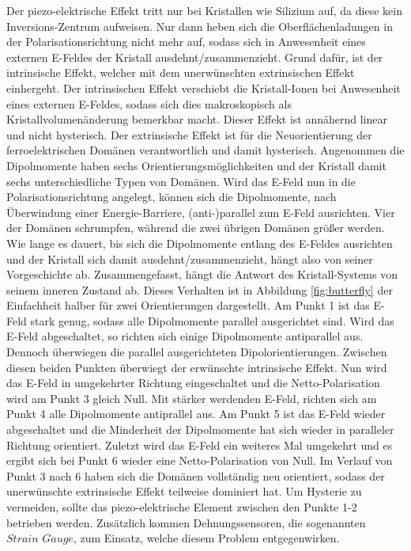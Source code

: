 \noindent
Der piezo-elektrische
Effekt tritt nur bei Kristallen wie Silizium auf, da diese kein Inversions-Zentrum
aufweisen. Nur dann heben sich die Oberflächenladungen in der Polarisationsrichtung
nicht mehr auf, sodass sich in Anwesenheit eines externen E-Feldes der Kristall
ausdehnt/zusammenzieht. Grund dafür, ist der intrinsische Effekt, welcher
mit dem unerwünschten extrinsischen Effekt einhergeht. Der intrinsischen Effekt
verschiebt die Kristall-Ionen bei Anwesenheit eines externen E-Feldes, sodass sich
dies makroskopisch als Kristallvolumenänderung bemerkbar macht. Dieser Effekt ist
annähernd linear und nicht hysterisch. Der extrinsische Effekt  ist für die
Neuorientierung der ferroelektrischen Domänen verantwortlich und damit hysterisch.
Angenommen die Dipolmomente haben sechs Orientierungsmöglichkeiten
und der Kristall damit sechs unterschiedliche Typen von Domänen. Wird das E-Feld nun in
die Polarisationsrichtung angelegt, können sich die Dipolmomente, nach Überwindung
einer Energie-Barriere, (anti-)parallel zum E-Feld ausrichten. Vier der Domänen
schrumpfen, während die zwei übrigen Domänen größer werden. Wie lange es dauert,
bis sich die Dipolmomente entlang des E-Feldes ausrichten und der Kristall sich damit
ausdehnt/zusammenzieht, hängt also von seiner Vorgeschichte ab. Zusammengefasst,
hängt die Antwort des Kristall-Systems von seinem inneren Zustand ab. Dieses
Verhalten ist in Abbildung \ref{fig:butterfly} der Einfachheit halber für zwei
Orientierungen dargestellt. Am Punkt 1 ist das E-Feld stark genug, sodass alle
Dipolmomente parallel ausgerichtet sind. Wird das E-Feld abgeschaltet, so
richten sich einige Dipolmomente antiparallel aus. Dennoch überwiegen die parallel
ausgerichteten Dipolorientierungen. Zwischen diesen beiden Punkten überwiegt der
erwünschte intrinsische Effekt.
Nun wird das E-Feld in umgekehrter Richtung eingeschaltet und die Netto-Polarisation
wird am Punkt 3 gleich Null. Mit stärker werdenden E-Feld, richten sich am Punkt 4 alle
Dipolmomente antiprallel aus. Am Punkt 5 ist das E-Feld wieder abgeschaltet und
die Minderheit der Dipolmomente hat sich wieder in paralleler Richtung orientiert.
Zuletzt wird das E-Feld ein weiteres Mal umgekehrt und es ergibt sich bei Punkt 6
wieder eine Netto-Polarisation
von Null. Im Verlauf von Punkt 3 nach 6 haben sich die Domänen vollständig neu orientiert,
sodass der unerwünschte extrinsische Effekt teilweise dominiert hat. Um Hysterie
zu vermeiden, sollte das piezo-elektrische Element zwischen den Punkte 1-2 betrieben
werden. Zusätzlich kommen Dehnungssensoren, die sogenannten $\textit{Strain Gauge}$,
zum Einsatz, welche diesem Problem entgegenwirken.



